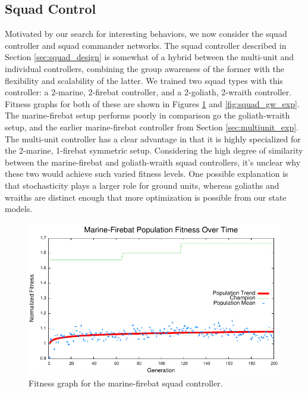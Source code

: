 \documentclass[10pt,a4paper,twocolumn]{article}
\begin{document}
\subsection{Squad Control}
\label{sec:squad_exp}

Motivated by our search for interesting behaviors, we now consider the squad controller and squad commander networks. The squad controller described in Section \ref{sec:squad_design} is somewhat of a hybrid between the multi-unit and individual controllers, combining the group awareness of the former with the flexibility and scalability of the latter. We trained two squad types with this controller: a 2-marine, 2-firebat controller, and a 2-goliath, 2-wraith controller. Fitness graphs for both of these are shown in Figures \ref{fig:squad_mf_exp} and \ref{fig:squad_gw_exp}. The marine-firebat setup performs poorly in comparison go the goliath-wraith setup, and the earlier marine-firebat controller from Section \ref{sec:multiunit_exp}. The multi-unit controller has a clear advantage in that it is highly specialized for the 2-marine, 1-firebat symmetric setup. Considering the high degree of similarity between the marine-firebat and goliath-wraith squad controllers, it's unclear why these two would achieve such varied fitness levels. One possible explanation is that stochasticity plays a larger role for ground units, whereas goliaths and wraiths are distinct enough that more optimization is possible from our state models.

\begin{figure}[t]
\centering
\includegraphics[scale=.59]{plots/squad_mf.pdf}
\caption{Fitness graph for the marine-firebat squad controller.}
\label{fig:squad_mf_exp}
\end{figure}
\end{document}
